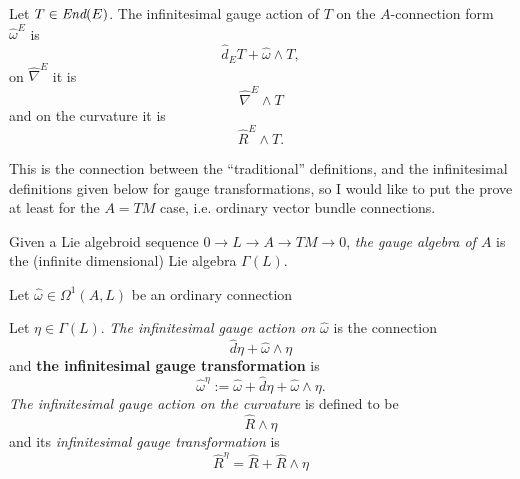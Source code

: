 {
\color{red}
\begin{proposition}
Let $T \in \operatorname{\textit{End}}(E)$. The infinitesimal gauge action of $T$ on the $A$-connection form $\hat \omega^E$ is
\begin{equation}
    \hat d_E T + \hat \omega \wedge T,
\end{equation}
on $\hat \nabla^E$ it is
\begin{equation}
    \hat \nabla^E \wedge T
\end{equation}
and on the curvature it is
\begin{equation}
    \hat R^E \wedge T.
\end{equation}
\end{proposition}

This is the connection between the ``traditional'' definitions, and the infinitesimal definitions given below for gauge transformations, so I would like to put the prove at least for the $A = TM$ case, i.e. ordinary vector bundle connections.
}

\linea



\begin{definition}
Given a Lie algebroid sequence $0 \to L \to A \to TM \to 0$, \emph{the gauge algebra of $A$} is the (infinite dimensional) Lie algebra $\Gamma(L)$.
\end{definition}

Let $\hat \omega \in \Omega^1(A, L)$ be an ordinary connection

\begin{definition}
Let $\eta \in \Gamma(L)$. \emph{The infinitesimal gauge action on $\hat \omega$} is the connection
\begin{equation}
    \hat d \eta + \hat \omega \wedge \eta
\end{equation}
and \textbf{the infinitesimal gauge transformation} is
\begin{equation}
    \hat \omega^\eta := \hat \omega + \hat d \eta + \hat \omega \wedge \eta.
\end{equation}
\emph{The infinitesimal gauge action on the curvature} is defined to be
\begin{equation}
    \hat R \wedge \eta
\end{equation}
and its \emph{infinitesimal gauge transformation} is
\begin{equation}
    \hat R^\eta = \hat R + \hat R \wedge \eta
\end{equation}
\end{definition}

